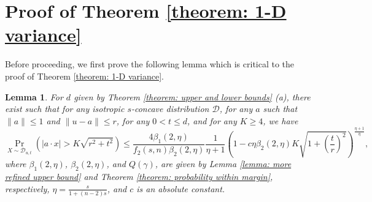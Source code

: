 \documentclass[11pt]{article}
\newcommand{\cD}{\mathcal{D}}
\newtheorem{lemma}[theorem]{Lemma}
\begin{document}
{{{{\section{Proof of Theorem \ref{theorem: 1-D variance}}
\label{section: proof of 1D variance}

Before proceeding, we first prove the following lemma which is critical to the proof of Theorem \ref{theorem: 1-D variance}.
\begin{lemma}
\label{lemma: probability of outside of margin}
For $d$ given by Theorem \ref{theorem: upper and lower bounds} (a), there exist such that for any isotropic $s$-concave distribution $\cD$, for any $a$ such that $\|a\|\le 1$ and $\|u-a\|\le r$, for any $0<t\le d$, and for any $K\ge 4$, we have
\begin{equation*}
\Pr_{X\sim \cD_{u,t}}(|a\cdot x|> K\sqrt{r^2+t^2})\le \frac{4\beta_1(2,\eta)}{f_2(s,n)\beta_2(2,\eta)}\frac{1}{\eta+1}\left(1-c\eta\beta_2(2,\eta)K\sqrt{1+\left(\frac{t}{r}\right)^2}\right)^{\frac{\eta+1}{\eta}},
\end{equation*}
where $\beta_1(2,\eta)$, $\beta_2(2,\eta)$, and $Q(\gamma)$, are given by Lemma \ref{lemma: more refined upper bound} and Theorem \ref{theorem: probability within margin}, respectively, $\eta=\frac{s}{1+(n-2)s}$, and $c$ is an absolute constant.
\end{lemma}

}}}}
\end{document}

